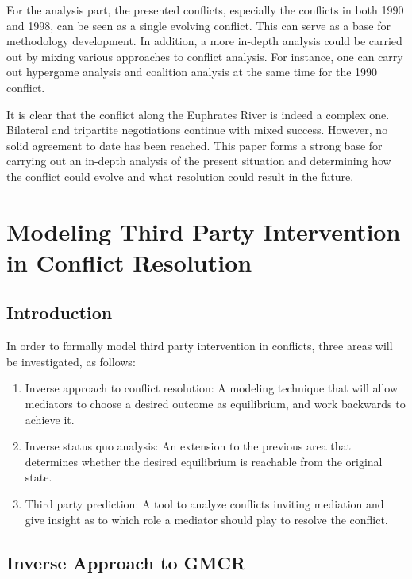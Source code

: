 \documentclass[letterpaper,12pt,titlepage,oneside,final]{book}
\begin{document}
For the analysis part, the presented conflicts, especially the conflicts in both 1990 and 1998, can be seen as a single evolving conflict. This can serve as a base for methodology development. In addition, a more in-depth analysis could be carried out by mixing various approaches to conflict analysis. For instance, one can carry out hypergame analysis and coalition analysis at the same time for the 1990 conflict.

It is clear that the conflict along the Euphrates River is indeed a complex one. Bilateral and tripartite negotiations continue with mixed success. However, no solid agreement to date has been reached. This paper forms a strong base for carrying out an in-depth analysis of the present situation and determining how the conflict could evolve and what resolution could result in the future. 



\chapter{Modeling Third Party Intervention in Conflict Resolution}

\section{Introduction}

In order to formally model third party intervention in conflicts, three areas will be investigated, as follows:
\begin{enumerate}
\item Inverse approach to conflict resolution: A modeling technique that will allow mediators to choose a desired outcome as equilibrium, and work backwards to achieve it.
\item Inverse status quo analysis: An extension to the previous area that determines whether the desired equilibrium is reachable from the original state.
\item Third party prediction: A tool to analyze conflicts inviting mediation and give insight as to which role a mediator should play to resolve the conflict.

\end{enumerate}


\section{Inverse Approach to GMCR}
\end{document}
